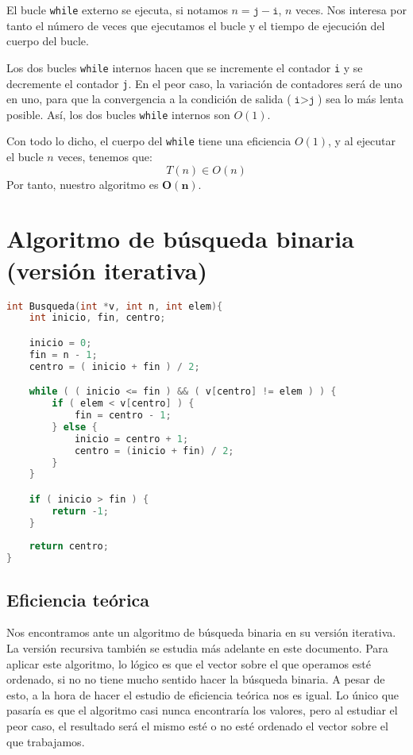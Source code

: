 \documentclass[10pt, a4paper]{article}
\theoremstyle{theorem-style}
\theoremstyle{theorem-style}
\theoremstyle{definition-style}
\theoremstyle{remark-style}
\theoremstyle{example-style}
\theoremstyle{definition-style}
\theoremstyle{remark-style}
\begin{document}
El bucle \texttt{while} externo se ejecuta, si notamos $n=\texttt{j}-\texttt{i}$, $n$ veces. Nos interesa por tanto el número de veces que ejecutamos el bucle y el tiempo de ejecución del cuerpo del bucle.

Los dos bucles \texttt{while} internos hacen que se incremente el contador \texttt{i} y se decremente el contador \texttt{j}. En el peor caso, la variación de contadores será de uno en uno, para que la convergencia a la condición de salida ($\texttt{i} > \texttt{j}$) sea lo más lenta posible. Así, los dos bucles \texttt{while} internos son $O(1)$.

Con todo lo dicho, el cuerpo del \texttt{while} tiene una eficiencia $O(1)$, y al ejecutar el bucle $n$ veces, tenemos que:
$$ T(n) \in O(n) $$
Por tanto, nuestro algoritmo es $\boldsymbol{O(n)}$.

\section{Algoritmo de búsqueda binaria (versión iterativa)}

\begin{lstlisting}[language=C]
int Busqueda(int *v, int n, int elem){
	int inicio, fin, centro;

	inicio = 0;
	fin = n - 1;
	centro = ( inicio + fin ) / 2;

	while ( ( inicio <= fin ) && ( v[centro] != elem ) ) {
		if ( elem < v[centro] ) {
			fin = centro - 1;
		} else {
			inicio = centro + 1;
			centro = (inicio + fin) / 2;
		}
	}

	if ( inicio > fin ) {
		return -1;
	}
	
	return centro;
}
\end{lstlisting}

\subsection{Eficiencia teórica}

Nos encontramos ante un algoritmo de búsqueda binaria en su versión iterativa. La versión recursiva también se estudia más adelante en este documento. Para aplicar este algoritmo, lo lógico es que el vector sobre el que operamos esté ordenado, si no no tiene mucho sentido hacer la búsqueda binaria. A pesar de esto, a la hora de hacer el estudio de eficiencia teórica nos es igual. Lo único que pasaría es que el algoritmo casi nunca encontraría los valores, pero al estudiar el peor caso, el resultado será el mismo esté o no esté ordenado el vector sobre el que trabajamos.
\end{document}
